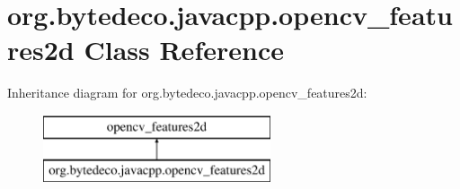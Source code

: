 \hypertarget{classorg_1_1bytedeco_1_1javacpp_1_1opencv__features2d}{}\section{org.\+bytedeco.\+javacpp.\+opencv\+\_\+features2d Class Reference}
\label{classorg_1_1bytedeco_1_1javacpp_1_1opencv__features2d}
Inheritance diagram for org.\+bytedeco.\+javacpp.\+opencv\+\_\+features2d\+:\begin{figure}[H]
\begin{center}
\leavevmode
\includegraphics[height=2.000000cm]{classorg_1_1bytedeco_1_1javacpp_1_1opencv__features2d}
\end{center}
\end{figure}
